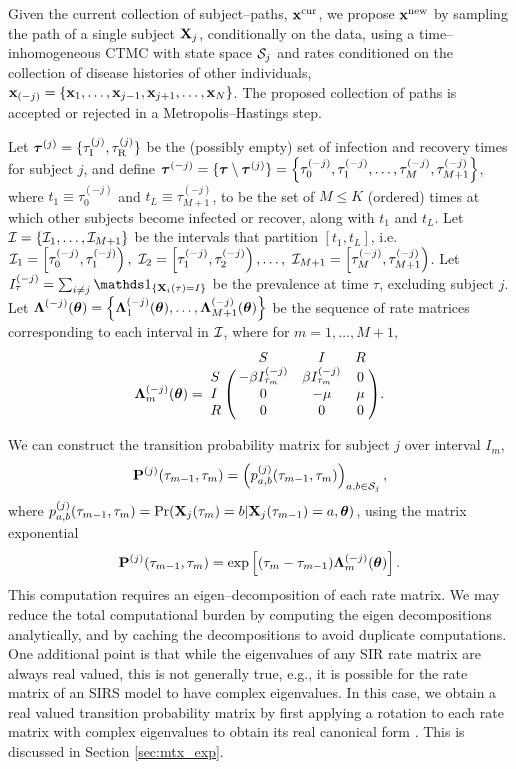 Given the current collection of subject--paths, $ \mathbf{x}^{\mathrm{cur}} $, we propose $ \mathbf{x}^{\mathrm{new}} $ by sampling the path of a single subject $\mathbf{X}_j$, conditionally on the data, using a time--inhomogeneous CTMC with state space $ \mathcal{S}_j  $ and rates conditioned on the collection of disease histories of other individuals, $ \mathbf{x}_{(-j)}  = \lbrace \mathbf{x}_1,\dots,\mathbf{x}_{j-1},\mathbf{x}_{j+1},\dots,\mathbf{x}_N \rbrace$. The proposed collection of paths is accepted or rejected in a Metropolis--Hastings step. 

Let $ \boldsymbol{\tau}^{(j)} = \lbrace \tau_\mathrm{I}^{(j)},\tau_\mathrm{R}^{(j)}\rbrace $ be the (possibly empty) set of infection and recovery times for subject $ j $, and define $ \boldsymbol{\tau}^{(-j)} = \lbrace\boldsymbol{\tau}\setminus\boldsymbol{\tau}^{(j)}\rbrace = \left \lbrace \tau_0^{(-j)} ,\tau_1^{(-j)}, \dots, \tau_{M}^{(-j)}, \tau_{M+1}^{(-j)}\right \rbrace$, where $ t_1 \equiv \tau_0^{(-j)} $ and $ t_L\equiv\tau_{M+1}^{(-j)} $, to be the set of $ M\leq K $ (ordered) times at which other subjects become infected or recover, along with $ t_1$ and $ t_L $. Let $ \mathcal{I} = \lbrace \mathcal{I}_1, \dots,\mathcal{I}_{M+1}\rbrace $ be the intervals that partition $ [t_1,t_L]$, i.e. $ \mathcal{I}_1 = \left [\tau_0^{(-j)},\tau_1^{(-j)}\right ),\ \mathcal{I}_2=\left [\tau_1^{(-j)},\tau_2^{(-j)}\right ),\dots,\ \mathcal{I}_{M+1}=\left [\tau_{M}^{(-j)},\tau_{M+1}^{(-j)}\right )$. Let $ I_\tau^{(-j)} = \sum_{i\neq j}\ind{\bX_i(\tau) = I} $ be the prevalence at time $ \tau $, excluding subject $ j $. Let $ \boldsymbol{\Lambda}^{(-j)}(\boldsymbol{\theta}) = \left \lbrace\boldsymbol{\Lambda}_1^{(-j)}(\boldsymbol{\theta}),\dots,\boldsymbol{\Lambda}_{M+1}^{(-j)}(\boldsymbol{\theta}) \right \rbrace$ be the sequence of rate matrices corresponding to each interval in $ \mathcal{I} $, where for $ m=1,\dots,M+1 $,
\begin{equation} \bLambda_m^{(-j)}(\btheta) = \bordermatrix{ & S & I & R \cr
	S & -\beta I_{\tau_m}^{(-j)} & \beta I_{\tau_m}^{(-j)} & 0 \cr 
	I & 0 & -\mu & \mu \cr
	R & 0 & 0 & 0 }.
\end{equation}

We can construct the transition probability matrix for subject $ j $ over interval $ I_m $, $$ \mathbf{P}^{(j)}(\tau_{m-1},\tau_m) = \left (
p_{a,b}^{(j)}(\tau_{m-1},\tau_m)\right )_{a,b\in \mathcal{S}_j}, $$ where $ p_{a,b}^{(j)}(\tau_{m-1},\tau_m) = \Pr(\mathbf{X}_j(\tau_m)=b|\mathbf{X}_j(\tau_{m-1})=a, \boldsymbol{\theta}) $, using the matrix exponential $$
	\mathbf{P}^{(j)} (\tau_{m-1},\tau_m)= \exp\left [(\tau_m - \tau_{m-1})\boldsymbol{\Lambda}^{(-j)}_m(\boldsymbol{\theta})\right ].
	$$
This computation requires an eigen--decomposition of each rate matrix. We may reduce the total computational burden by computing the eigen decompositions analytically, and by caching the decompositions to avoid duplicate computations. One additional point is that while the eigenvalues of any SIR rate matrix are always real valued, this is not generally true, e.g., it is possible for the rate matrix of an SIRS model to have complex eigenvalues. In this case, we obtain a real valued transition probability matrix by first applying a rotation to each rate matrix with complex eigenvalues to obtain its real canonical form \cite{hirsch2013differential}. This is discussed in Section \ref{sec:mtx_exp}.

